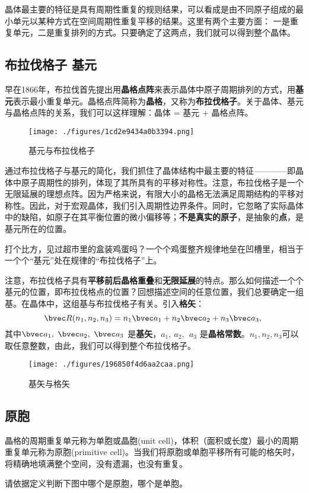 
晶体最主要的特征是具有周期性重复的规则结果，可以看成是由不同原子组成的最小单元以某种方式在空间周期性重复平移的结果。这里有两个主要方面：
一是重复单元，二是重复排列的方式。只要确定了这两点，我们就可以得到整个晶体。

\subsection{布拉伐格子 基元}
早在1866年，布拉伐首先提出用\textbf{晶格点阵}来表示晶体中原子周期排列的方式，用\textbf{基元}表示最小重复单元。晶格点阵简称为\textbf{晶格}，又称为\textbf{布拉伐格子}。关于晶体、基元与晶格点阵的关系，我们可以这样理解：晶体 = 基元 + 晶格点阵。
\begin{figure}[ht]
\centering
\texttt{[image: ./figures/1cd2e9434a0b3394.png]}
\caption{ 基元与布拉伐格子} \label{fig_BraLat_1}
\end{figure}

通过布拉伐格子与基元的简化，我们抓住了晶体结构中最主要的特征————即晶体中原子周期性的排列，体现了其所具有的平移对称性。注意，布拉伐格子是一个无限延展的理想点阵。因为严格来说，有限大小的晶格无法满足周期结构的平移对称性。因此，对于宏观晶体，我们引入周期性边界条件。同时，它忽略了实际晶体中的缺陷，如原子在其平衡位置的微小偏移等；\textbf{不是真实的原子}，是抽象的\textbf{点}，是基元所在的位置。

打个比方，见过超市里的盒装鸡蛋吗？一个个鸡蛋整齐规律地垒在凹槽里，相当于一个个“基元”处在规律的“布拉伐格子”上。

注意，布拉伐格子具有\textbf{平移前后晶格重叠}和\textbf{无限延展}的特点。那么如何描述一个个基元的位置，即布拉伐格点的位置？回想描述空间的任意位置，我们总要确定一组基。在晶体中，这组基与布拉伐格子有关。引入\textbf{格矢}：
\begin{equation}
\bvec R(n_1, n_2, n_3) = n_1 \bvec a_1 + n_2 \bvec a_2 + n_3 \bvec a_3,~ 
\end{equation}
其中$\bvec a_1,~\bvec a_2,~\bvec a_3$ 是\textbf{基矢}，$a_1,~ a_2,~\ a_3$ 是\textbf{晶格常数}。$n_1, n_2, n_3$可以取任意整数，由此，我们可以得到整个布拉伐格子。

\begin{figure}[ht]
\centering
\texttt{[image: ./figures/196850f4d6aa2caa.png]}
\caption{基矢与格矢} \label{fig_BraLat_2}
\end{figure}

\subsection{原胞}
晶格的周期重复单元称为单胞或晶胞(unit cell)，体积（面积或长度）最小的周期重复单元称为原胞(primitive cell)。当我们将原胞或单胞平移所有可能的格矢时，将精确地填满整个空间，没有遗漏，也没有重复。
\begin{exercise}{}
请依据定义判断下图中哪个是原胞，哪个是单胞。
\end{exercise}

